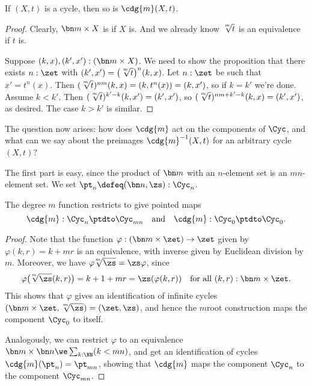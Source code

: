 \begin{lemma}
  If $(X,t)$ is a cycle, then so is $\cdg{m}(X,t)$.
\end{lemma}
\begin{proof}
  Clearly, $\bn m\times X$ is \nonempty if $X$ is.
  And we already know $\sqrt[\uproot{2}m]{t}$ is an equivalence if $t$ is.

  Suppose $(k,x),(k',x'): (\bn m\times X)$.
  We need to show the proposition that there exists $n:\zet$
  with $(k',x') = \bigl(\sqrt[\uproot{2}m]t\bigr)^n(k,x)$.
  Let $n:\zet$ be such that $x' = t^n(x)$.
  Then $(\sqrt[\uproot{2}m]t)^{nm}(k,x) = (k,t^n(x)) = (k,x')$,
  so if $k=k'$ we're done.
  Assume $k<k'$. Then $(\sqrt[\uproot{2}m]t)^{k'-k}(k,x') = (k',x')$,
  so $(\sqrt[\uproot{2}m]t)^{nm+k'-k}(k,x) = (k',x')$, as desired.
  The case $k>k'$ is similar.
\end{proof}

The question now arises: how does $\cdg{m}$ act on the components of $\Cyc$,
and what can we say about the preimages $\cdg{m}^{-1}(X,t)$
for an arbitrary cycle $(X,t)$?

The first part is easy, since the product of $\bn m$ with an $n$-element set
is an $mn$-element set. We set $\pt_n \defeq (\bn n,\zs) : \Cyc_n$.
\begin{lemma}
  The degree $m$ function restricts to give pointed maps
  \[
    \cdg{m} : \Cyc_n \ptdto \Cyc_{mn} \quad\text{and}\quad
    \cdg{m} : \Cyc_0 \ptdto \Cyc_0.
  \]
\end{lemma}
\begin{proof}
  Note
  that the function $\varphi : (\bn m\times \zet) \to \zet$
  given by $\varphi(k,r)=k+mr$ is an equivalence,
  with inverse given by Euclidean division by $m$.
  Moreover, we have ${\varphi\!\sqrt[\uproot{2}m]\zs} = {\zs\varphi}$, since
  \[
    \varphi\bigl(\!\sqrt[\uproot{2}m]\zs(k,r)\bigr)
    = k+1+mr = \zs(\varphi(k,r))
    \quad\text{for all $(k,r):\bn m\times \zet$}.
  \]
  This shows that $\varphi$ gives an identification of infinite cycles
  $(\bn m\times\zet, \sqrt[\uproot{2}m]\zs) = (\zet,\zs)$,
  and hence the $m$\th root construction maps the component $\Cyc_0$ to itself.

  Analogously, we can restrict $\varphi$ to
  an equivalence $\bn m \times \bn n \we \sum_{k:\NN}(k<mn)$,
  and get an identification of cycles $\cdg{m}(\pt_n) = \pt_{mn}$,
  showing that $\cdg{m}$ maps the component $\Cyc_n$ to the component $\Cyc_{mn}$.
\end{proof}

